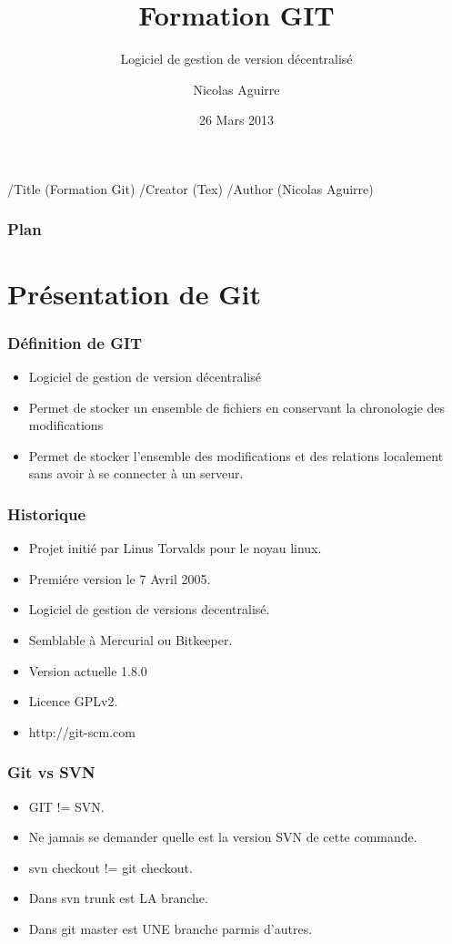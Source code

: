 \documentclass{beamer}
\begin{document}
\pdfinfo
    {
      /Title       (Formation Git)
      /Creator     (Tex)
      /Author      (Nicolas Aguirre)
    }


    \title{Formation GIT}
    \subtitle{Logiciel de gestion de version décentralisé}
    \author{Nicolas Aguirre}
    \date{26 Mars 2013}

    \frame{\titlepage}
    \begin{frame}\frametitle{Plan}
      \tableofcontents
    \end{frame}

    \section{Présentation de Git}

    \begin{frame}
      \frametitle{Définition de GIT}
      \begin{itemize}
        \item Logiciel de gestion de version décentralisé
        \item Permet de stocker un ensemble de fichiers en conservant la chronologie des modifications
        \item Permet de stocker l'ensemble des modifications et des relations localement sans avoir à se connecter à un serveur.
      \end{itemize}
    \end{frame}

    \begin{frame}
      \frametitle{Historique}
      \begin{itemize}
      \item Projet initié par Linus Torvalds pour le noyau linux.
      \item Premiére version le 7 Avril 2005.
      \item Logiciel de gestion de versions decentralisé.
      \item Semblable à Mercurial ou Bitkeeper.
      \item Version actuelle 1.8.0
      \item Licence GPLv2.
      \item http://git-scm.com
      \end{itemize}
    \end{frame}

    \begin{frame}
      \frametitle{Git vs SVN}
      \begin{itemize}
        \item GIT != SVN.
        \item Ne jamais se demander quelle est la version SVN de cette commande.
        \item svn checkout != git checkout.
        \item Dans svn trunk est LA branche.
        \item Dans git master est UNE branche parmis d'autres.
      \end{itemize}
    \end{frame}
\end{document}
